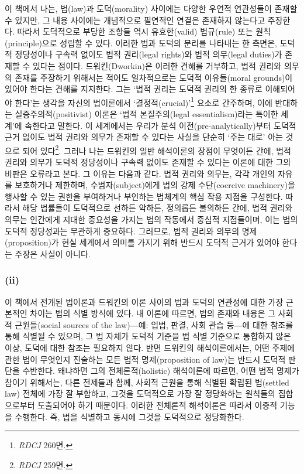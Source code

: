 이 책에서 나는, 법(law)과 도덕(morality) 사이에는 다양한 우연적
연관성들이 존재할 수 있지만, 그 내용 사이에는 개념적으로 필연적인 연결은
존재하지 않는다고 주장한다. 따라서 도덕적으로 부당한 조항들 역시
유효한(valid) 법규(rule) 또는 원칙(principle)으로 성립할 수 있다. 이러한
법과 도덕의 분리를 나타내는 한 측면은, 도덕적 정당성이나 구속력 없이도
법적 권리(legal rights)와 법적 의무(legal duties)가 존재할 수 있다는
점이다. 드워킨(Dworkin)은 이러한 견해를 거부하고, 법적 권리와 의무의
존재를 주장하기 위해서는 적어도 일차적으로는 도덕적 이유들(moral
grounds)이 있어야 한다는 견해를 지지한다. 그는 `법적 권리는 도덕적
권리의 한 종류로 이해되어야 한다'는 생각을 자신의 법이론에서
`결정적(crucial)'\footnote{\emph{RDCJ} 260면.} 요소로 간주하며, 이에
반대하는 실증주의적(positivist) 이론은 `법적 본질주의(legal
essentialism)라는 특이한 세계'에 속한다고 말한다. 이 세계에서는 우리가
분석 이전(pre-analytically)부터 도덕적 근거 없이도 법적 권리와 의무가
존재할 수 있다는 사실을 단순히 `주는 대로' 아는 것으로 되어
있다\footnote{\emph{RDCJ} 259면.}. 그러나 나는 드워킨의 일반 해석이론의
장점이 무엇이든 간에, 법적 권리와 의무가 도덕적 정당성이나 구속력 없이도
존재할 수 있다는 이론에 대한 그의 비판은 오류라고 본다. 그 이유는 다음과
같다. 법적 권리와 의무는, 각각 개인의 자유를 보호하거나 제한하며,
수범자(subject)에게 법의 강제 수단(coercive machinery)을 행사할 수 있는
권한을 부여하거나 부인하는 법체계의 핵심 작용 지점을 구성한다. 따라서
해당 법률들이 도덕적으로 선하든 악하든, 정의롭든 불의하든 간에, 법적
권리와 의무는 인간에게 지대한 중요성을 가지는 법의 작동에서 중심적
지점들이며, 이는 법의 도덕적 정당성과는 무관하게 중요하다. 그러므로,
법적 권리와 의무의 명제(proposition)가 현실 세계에서 의미를 가지기 위해
반드시 도덕적 근거가 있어야 한다는 주장은 사실이 아니다.

\subsubsection{\texorpdfstring{(ii) }{(ii) 법의 식별 (The Identification of the Law)}}\label{ii-uxbc95uxc758-uxc2dduxbcc4-the-identification-of-the-law}

이 책에서 전개된 법이론과 드워킨의 이론 사이의 법과 도덕의 연관성에 대한
가장 근본적인 차이는 법의 식별 방식에 있다. 내 이론에 따르면, 법의
존재와 내용은 그 사회적 근원들(social sources of the law)―예: 입법,
판결, 사회 관습 등―에 대한 참조를 통해 식별될 수 있으며, 그 법 자체가
도덕적 기준을 법 식별 기준으로 통합하지 않은 이상, 도덕에 대한 참조는
필요하지 않다. 반면 드워킨의 해석이론에서는, 어떤 주제에 관한 법이
무엇인지 진술하는 모든 법적 명제(proposition of law)는 반드시 도덕적
판단을 수반한다. 왜냐하면 그의 전체론적(holistic) 해석이론에 따르면,
어떤 법적 명제가 참이기 위해서는, 다른 전제들과 함께, 사회적 근원을 통해
식별된 확립된 법(settled law) 전체에 가장 잘 부합하고, 그것을 도덕적으로
가장 잘 정당화하는 원칙들의 집합으로부터 도출되어야 하기 때문이다.
이러한 전체론적 해석이론은 따라서 이중적 기능을 수행한다. 즉, 법을
식별하고 동시에 그것을 도덕적으로 정당화한다.

